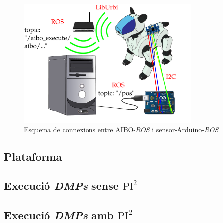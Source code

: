 \documentclass[12pt,a4paper,final,twoside]{article}
\begin{document}
\begin{figure}[tb]
\centering
\includegraphics[width=0.8\textwidth]{Imatges/esquema-comunicacio-ROS-Aibo-ordenadora.pdf}
\caption{Esquema de connexions entre AIBO-\textit{ROS} i sensor-Arduino-\textit{ROS}}
\label{fig:connexions-Aibo-ROS-sensor-Arduino-ROS}
\end{figure}


\subsection{Plataforma}

\subsection{Execució \textit{DMPs} sense $\mathrm{PI^2}$}
\subsection{Execució \textit{DMPs} amb $\mathrm{PI^2}$}
\end{document}
